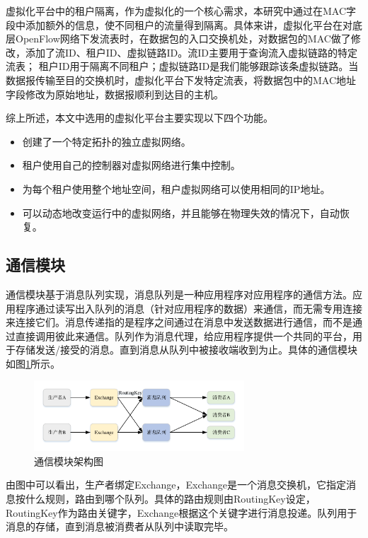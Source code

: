 虚拟化平台中的租户隔离，作为虚拟化的一个核心需求，本研究中通过在MAC字段中添加额外的信息，使不同租户的流量得到隔离。具体来讲，虚拟化平台在对底层OpenFlow网络下发流表时，在数据包的入口交换机处，对数据包的MAC做了修改，添加了流ID、租户ID、虚拟链路ID。流ID主要用于查询流入虚拟链路的特定流表； 租户ID用于隔离不同租户；虚拟链路ID是我们能够跟踪该条虚拟链路。当数据报传输至目的交换机时，虚拟化平台下发特定流表，将数据包中的MAC地址字段修改为原始地址，数据报顺利到达目的主机。

综上所述，本文中选用的虚拟化平台主要实现以下四个功能。
\begin{itemize}
\item 创建了一个特定拓扑的独立虚拟网络。
\item 租户使用自己的控制器对虚拟网络进行集中控制。
\item 为每个租户使用整个地址空间，租户虚拟网络可以使用相同的IP地址。
\item 可以动态地改变运行中的虚拟网络，并且能够在物理失效的情况下，自动恢复。
\end{itemize}


\subsection{通信模块}
通信模块基于消息队列实现，消息队列是一种应用程序对应用程序的通信方法。应用程序通过读写出入队列的消息（针对应用程序的数据）来通信，而无需专用连接来连接它们。消息传递指的是程序之间通过在消息中发送数据进行通信，而不是通过直接调用彼此来通信。队列作为消息代理，给应用程序提供一个共同的平台，用于存储发送/接受的消息。直到消息从队列中被接收端收到为止。具体的通信模块如图\ref{fig:rabbitmq}所示。

\begin{figure}[!htb]
  \centering
  \includegraphics[width=0.7\textwidth]{logo/rabbitmq}
  \caption{通信模块架构图}
  \label{fig:rabbitmq}
\end{figure}

由图中可以看出，生产者绑定Exchange，Exchange是一个消息交换机，它指定消息按什么规则，路由到哪个队列。具体的路由规则由RoutingKey设定，RoutingKey作为路由关键字，Exchange根据这个关键字进行消息投递。队列用于消息的存储，直到消息被消费者从队列中读取完毕\cite{rabbitmq}。

